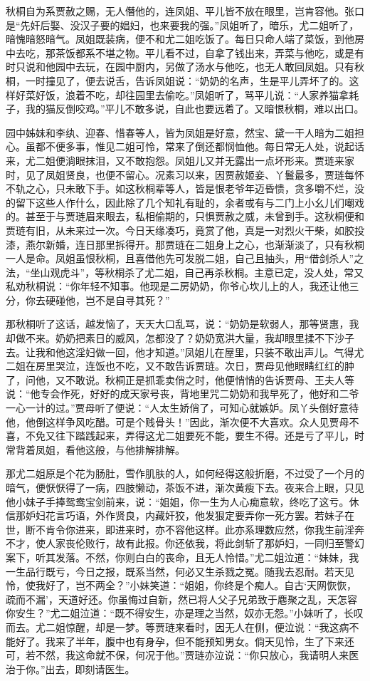 \documentclass[12pt,oneside]{book}
\begin{document}
秋桐自为系贾赦之赐，无人僭他的，连凤姐、平儿皆不放在眼里，岂肯容他。张口是“先奸后娶、没汉子要的娼妇，也来要我的强。”凤姐听了，暗乐，尤二姐听了，暗愧暗怒暗气。凤姐既装病，便不和尤二姐吃饭了。每日只命人端了菜饭，到他房中去吃，那茶饭都系不堪之物。平儿看不过，自拿了钱出来，弄菜与他吃，或是有时只说和他园中去玩，在园中厨内，另做了汤水与他吃，也无人敢回凤姐。只有秋桐，一时撞见了，便去说舌，告诉凤姐说：“奶奶的名声，生是平儿弄坏了的。这样好菜好饭，浪着不吃，却往园里去偷吃。”凤姐听了，骂平儿说：“人家养猫拿耗子，我的猫反倒咬鸡。”平儿不敢多说，自此也要远着了。又暗恨秋桐，难以出口。

园中姊妹和李纨、迎春、惜春等人，皆为凤姐是好意，然宝、黛一干人暗为二姐担心。虽都不便多事，惟见二姐可怜，常来了倒还都悯恤他。每日常无人处，说起话来，尤二姐便淌眼抹泪，又不敢抱怨。凤姐儿又并无露出一点坏形来。贾琏来家时，见了凤姐贤良，也便不留心。况素习以来，因贾赦姬妾、丫鬟最多，贾琏每怀不轨之心，只未敢下手。如这秋桐辈等人，皆是恨老爷年迈昏愦，贪多嚼不烂，没的留下这些人作什么，因此除了几个知礼有耻的，余者或有与二门上小幺儿们嘲戏的。甚至于与贾琏眉来眼去，私相偷期的，只惧贾赦之威，未曾到手。这秋桐便和贾琏有旧，从未来过一次。今日天缘凑巧，竟赏了他，真是一对烈火干柴，如胶投漆，燕尔新婚，连日那里拆得开。那贾琏在二姐身上之心，也渐渐淡了，只有秋桐一人是命。凤姐虽恨秋桐，且喜借他先可发脱二姐，自己且抽头，用“借剑杀人”之法，“坐山观虎斗”，等秋桐杀了尤二姐，自己再杀秋桐。主意已定，没人处，常又私劝秋桐说：“你年轻不知事。他现是二房奶奶，你爷心坎儿上的人，我还让他三分，你去硬碰他，岂不是自寻其死？”

那秋桐听了这话，越发恼了，天天大口乱骂，说：“奶奶是软弱人，那等贤惠，我却做不来。奶奶把素日的威风，怎都没了？奶奶宽洪大量，我却眼里揉不下沙子去。让我和他这淫妇做一回，他才知道。”凤姐儿在屋里，只装不敢出声儿。气得尤二姐在房里哭泣，连饭也不吃，又不敢告诉贾琏。次日，贾母见他眼睛红红的肿了，问他，又不敢说。秋桐正是抓乖卖俏之时，他便悄悄的告诉贾母、王夫人等说：“他专会作死，好好的成天家号丧，背地里咒二奶奶和我早死了，他好和二爷一心一计的过。”贾母听了便说：“人太生娇俏了，可知心就嫉妒。凤丫头倒好意待他，他倒这样争风吃醋。可是个贱骨头！”因此，渐次便不大喜欢。众人见贾母不喜，不免又往下踏践起来，弄得这尤二姐要死不能，要生不得。还是亏了平儿，时常背着凤姐，看他这般，与他排解排解。

那尤二姐原是个花为肠肚，雪作肌肤的人，如何经得这般折磨，不过受了一个月的暗气，便恹恹得了一病，四肢懒动，茶饭不进，渐次黄瘦下去。夜来合上眼，只见他小妹子手捧鸳鸯宝剑前来，说：“姐姐，你一生为人心痴意软，终吃了这亏。休信那妒妇花言巧语，外作贤良，内藏奸狡，他发狠定要弄你一死方罢。若妹子在世，断不肯令你进来，即进来时，亦不容他这样。此亦系理数应然，你我生前淫奔不才，使人家丧伦败行，故有此报。你还依我，将此剑斩了那妒妇，一同归至警幻案下，听其发落。不然，你则白白的丧命，且无人怜惜。”尤二姐泣道：“妹妹，我一生品行既亏，今日之报，既系当然，何必又生杀戮之冤。随我去忍耐。若天见怜，使我好了，岂不两全？”小妹笑道：“姐姐，你终是个痴人。自古‘天网恢恢，疏而不漏’，天道好还。你虽悔过自新，然已将人父子兄弟致于麀聚之乱，天怎容你安生？”尤二姐泣道：“既不得安生，亦是理之当然，奴亦无怨。”小妹听了，长叹而去。尤二姐惊醒，却是一梦。等贾琏来看时，因无人在侧，便泣说：“我这病不能好了。我来了半年，腹中也有身孕，但不能预知男女。倘天见怜，生了下来还可，若不然，我这命就不保，何况于他。”贾琏亦泣说：“你只放心，我请明人来医治于你。”出去，即刻请医生。
\end{document}
